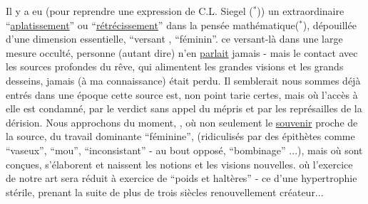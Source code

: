 Il y a eu  (pour reprendre  une expression de C.L. Siegel ($^{\ast}$)) un extraordinaire ``\uline{aplatissement}'' ou ``\uline{rétrécissement}'' dans la pensée mathématique($^{\ast}$), dépouillée d'une dimension essentielle,    ``versant ,    ``féminin''.   ce versant-là     dans une large mesure occulté,  personne (autant dire) n'en \uline{parlait} jamais - mais le contact avec les sources profondes du rêve, qui alimentent  les grandes visions et les grands desseins,   jamais  (à ma connaissance) était perdu. Il semblerait   nous sommes déjà entrés dans une époque    cette source est, non point tarie certes, mais où l'accès à elle est condamné, par le verdict sans appel  du mépris   et par les représailles de la dérision. Nous approchons du moment, , où  non seulement le \uline{souvenir}     proche de la source, du travail   dominante ``féminine'',  (ridiculisés par des épithètes comme ``vaseux'', ``mou'', ``inconsistant'' -  au bout opposé,   ``bombinage''  ...), mais      où sont conçues, s'élaborent et naissent les notions et les visions nouvelles.    où l'exercice de notre art sera réduit à   exercice de ``poids et haltères'' - ce d'une hypertrophie  stérile, prenant la suite de plus de trois siècles  renouvellement créateur...

